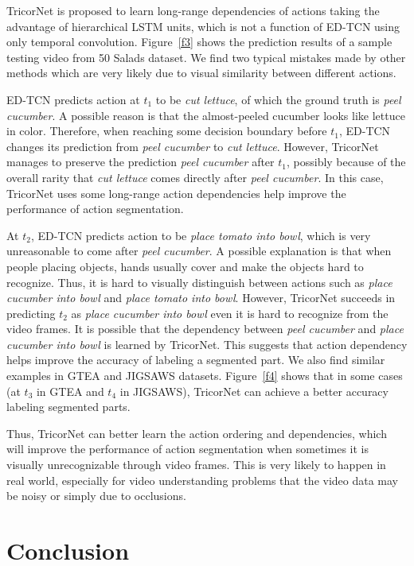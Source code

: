 \documentclass{article}
\begin{document}
TricorNet is proposed to learn long-range dependencies of actions taking the advantage of hierarchical LSTM units, which is not a function of ED-TCN using only temporal convolution. Figure~\ref{f3} shows the prediction results of a sample testing video from 50 Salads dataset. We find two typical mistakes made by other methods which are very likely due to visual similarity between different actions. 

ED-TCN predicts action at $t_1$ to be \textit{cut lettuce}, of which the ground truth is \textit{peel cucumber}. A possible reason is that the almost-peeled cucumber looks like lettuce in color. Therefore, when reaching some decision boundary before $t_1$, ED-TCN changes its prediction from \textit{peel cucumber} to \textit{cut lettuce}. However, TricorNet manages to preserve the prediction \textit{peel cucumber} after $t_1$, possibly because of the overall rarity that \textit{cut lettuce} comes directly after \textit{peel cucumber}. In this case, TricorNet uses some long-range action dependencies help improve the performance of action segmentation.

At $t_2$, ED-TCN predicts action to be \textit{place tomato into bowl}, which is very unreasonable to come after \textit{peel cucumber}. A possible explanation is that when people placing objects, hands usually cover and make the objects hard to recognize. Thus, it is hard to visually distinguish between actions such as \textit{place cucumber into bowl} and \textit{place tomato into bowl}. However, TricorNet succeeds in predicting $t_2$ as  \textit{place cucumber into bowl} even it is hard to recognize from the video frames. It is possible that the dependency between \textit{peel cucumber} and \textit{place cucumber into bowl} is learned by TricorNet. This suggests that action dependency helps improve the accuracy of labeling a segmented part. We also find similar examples in GTEA and JIGSAWS datasets. Figure~\ref{f4} shows that in some cases (at $t_3$ in GTEA and $t_4$ in JIGSAWS), TricorNet can achieve a better accuracy labeling segmented parts. 

Thus, TricorNet can better learn the action ordering and dependencies, which will improve the performance of action segmentation when sometimes it is visually unrecognizable through video frames. This is very likely to happen in real world, especially for video understanding problems that the video data may be noisy or simply due to occlusions. 


\section{Conclusion}
\label{sec:con}
\end{document}
